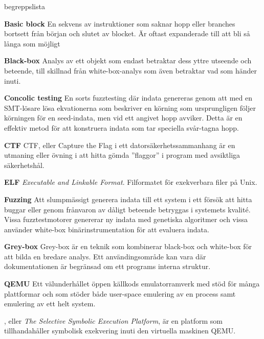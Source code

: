 \begin{labeling}{begreppslista}

	\item[\textbf{Basic block}] En sekvens av instruktioner som saknar
	hopp eller branches bortsett från början och slutet av
	blocket. Är oftast expanderade till att bli så långa som möjligt

	\item [\textbf{Black-box}] Analys av ett objekt som endast betraktar dess
	yttre utseende och beteende, till skillnad från white-box-analys som även
	betraktar vad som händer inuti.

	\item [\textbf{Concolic testing}] En sorts fuzztesting där indata genereras
	genom att med en SMT-lösare lösa ekvationerna som beskriver en körning som
	ursprungligen följer körningen för en seed-indata, men vid ett angivet
	hopp avviker. Detta är en effektiv metod för att konstruera indata som tar
	speciella svår-tagna hopp.

	\item [\textbf{CTF}] CTF, eller Capture the Flag i ett
	datorsäkerhetssammanhang är en utmaning eller övning i
	att hitta gömda ''flaggor'' i program med avsiktliga säkerhetshål.

	\item [\textbf{ELF}] \emph{Executable and Linkable Format}. Filformatet för
	exekverbara filer på Unix.

	\item [\textbf{Fuzzing}] Att slumpmässigt generera indata till ett system i
	ett försök att hitta buggar eller genom frånvaron av dåligt beteende
	betryggas i systemets kvalité. Vissa fuzztestmotorer genererar ny indata
	med genetiska algoritmer och vissa använder white-box binärinstrumentation
	för att evaluera indata.

	\item [\textbf{Grey-box}] Grey-box är en teknik som kombinerar black-box och
	white-box för att bilda en bredare analys. Ett användingsområde kan vara där
	dokumentationen är begränsad om ett programs interna struktur.

	\item [\textbf{QEMU}] Ett välunderhållet öppen källkods emulatorramverk med stöd
	för många plattformar och som stöder både user-space emulering av en process
	samt emulering av ett helt system.

	\item [\textbf{\stoe}] \stoe, eller \emph{The Selective Symbolic Execution Platform}, är
	en platform som tillhandahåller symbolisk exekvering inuti den virtuella
	maskinen QEMU.\@


\end{labeling}
